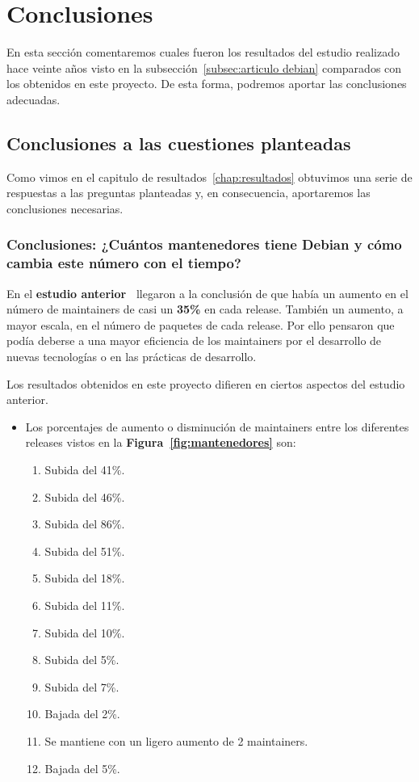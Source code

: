 \documentclass[a4paper, 12pt]{book}
\begin{document}
\cleardoublepage
\chapter{Conclusiones}
\label{chap:conclusiones}
En esta sección comentaremos cuales fueron los resultados del estudio realizado hace veinte años visto en la subsección~\ref{subsec:articulo debian} comparados con los obtenidos en este proyecto. De esta forma, podremos aportar las conclusiones adecuadas.

\section{Conclusiones a las cuestiones planteadas}
\label{sec:conclusiones-cuestiones}
Como vimos en el capitulo de resultados~\ref{chap:resultados} obtuvimos una serie de respuestas a las preguntas planteadas y, en consecuencia, aportaremos las conclusiones necesarias.

\subsection{Conclusiones: ¿Cuántos mantenedores tiene Debian y cómo cambia este número con el tiempo?}
\label{subsec:conclusion_1}
En el \textbf{estudio anterior~\cite{robles05:_debian}} llegaron a la conclusión de que había un aumento en el número de maintainers de casi un \textbf{35\%} en cada release. También un aumento, a mayor escala, en el número de paquetes de cada release. Por ello pensaron que podía deberse a una mayor eficiencia de los maintainers por el desarrollo de nuevas tecnologías o en las prácticas de desarrollo.

Los resultados obtenidos en este proyecto difieren en ciertos aspectos del estudio anterior.
\begin{itemize}
	\item Los porcentajes de aumento o disminución de maintainers entre los diferentes releases vistos en la \textbf{Figura~\ref{fig:mantenedores}} son: 
	\begin{enumerate}
		\item Subida del 41\%.
		\item Subida del 46\%.
		\item Subida del 86\%.
		\item Subida del 51\%.
		\item Subida del 18\%.
		\item Subida del 11\%.
		\item Subida del 10\%.
		\item Subida del 5\%.
		\item Subida del 7\%.
		\item Bajada del 2\%.
		\item Se mantiene con un ligero aumento de 2 maintainers.
		\item Bajada del 5\%.
	\end{enumerate}
\end{itemize}
\end{document}

